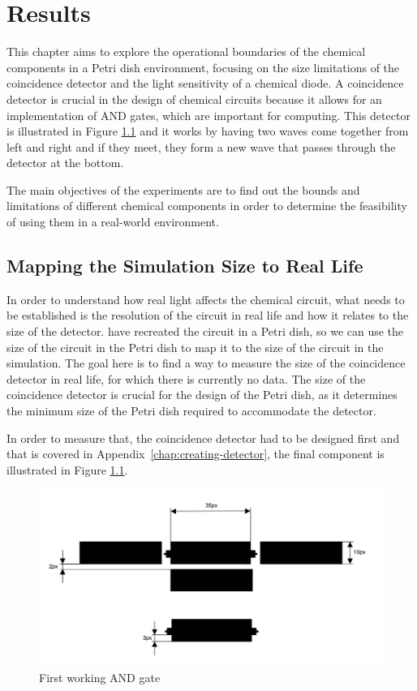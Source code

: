 \chapter{Results}
This chapter aims to explore the operational boundaries of the chemical components in a Petri dish environment, focusing on the size limitations of the coincidence detector and the light sensitivity of a chemical diode.
A coincidence detector is crucial in the design of chemical circuits because it allows for an implementation of AND gates,
which are important for computing. This detector is illustrated in Figure \ref{fig:and-gate} and it works by having two waves come together from left and right and if they meet, they form a new wave that passes through the detector at the bottom.

The main objectives of the experiments are to find out the bounds and limitations of different chemical components in order to determine the feasibility of using them in a real-world environment.

\section{Mapping the Simulation Size to Real Life} \label{sec:mapping-simulation-to-real-life}
In order to understand how real light affects the chemical circuit, what needs to be established is the resolution of the circuit in real life and how it relates to the size of the detector. \cite{gorecki2003chemical} have recreated the circuit in a Petri dish, so we can use the size of the circuit in the Petri dish to map it to the size of the circuit in the simulation.
The goal here is to find a way to measure the size of the coincidence detector in real life, for which there is currently no data. The size of the coincidence detector is crucial for the design of the Petri dish, as it determines the minimum size of the Petri dish required to accommodate the detector. 

In order to measure that, the coincidence detector had to be designed first and that is covered in Appendix~\ref{chap:creating-detector}, the final component is illustrated in Figure \ref{fig:and-gate}.


\begin{figure}
    \centering
    \includegraphics[width=1\linewidth]{measurement-and.jpg}
    \caption{First working AND gate}
    \label{fig:and-gate}
\end{figure}

